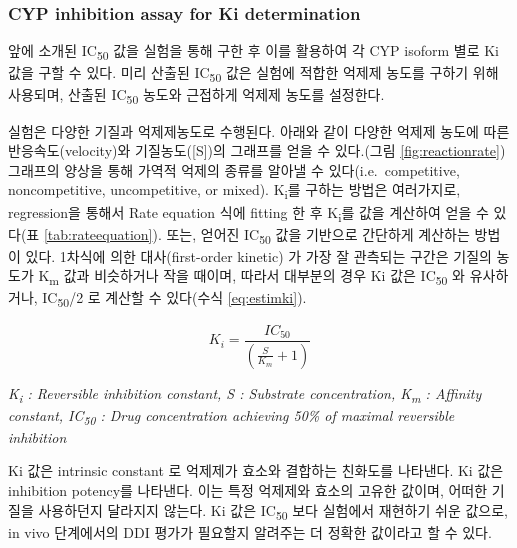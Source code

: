 \documentclass[
  11pt,
  krantz2, a4paper, twoside]{krantz}
\begin{document}
\subsubsection{CYP inhibition assay for Ki determination}\label{cyp-inhibition-assay-for-ki-determination}

앞에 소개된 IC\textsubscript{50} 값을 실험을 통해 구한 후 이를 활용하여 각 CYP isoform
별로 Ki 값을 구할 수 있다. 미리 산출된 IC\textsubscript{50} 값은 실험에 적합한 억제제
농도를 구하기 위해 사용되며, 산출된 IC\textsubscript{50} 농도와 근접하게 억제제 농도를
설정한다.

실험은 다양한 기질과 억제제농도로 수행된다. 아래와 같이 다양한 억제제
농도에 따른 반응속도(velocity)와 기질농도({[}S{]})의 그래프를 얻을 수
있다.(그림 \ref{fig:reactionrate}) 그래프의 양상을 통해 가역적 억제의
종류를 알아낼 수 있다(i.e.~competitive, noncompetitive, uncompetitive,
or mixed). K\textsubscript{i}를 구하는 방법은 여러가지로, regression을 통해서 Rate
equation 식에 fitting 한 후 K\textsubscript{i}를 값을 계산하여 얻을 수 있다(표
\ref{tab:rateequation}). 또는, 얻어진 IC\textsubscript{50} 값을 기반으로 간단하게
계산하는 방법이 있다. 1차식에 의한 대사(first-order kinetic) 가 가장 잘
관측되는 구간은 기질의 농도가 K\textsubscript{m} 값과 비슷하거나 작을 때이며, 따라서
대부분의 경우 Ki 값은 IC\textsubscript{50} 와 유사하거나, IC\textsubscript{50}/2 로 계산할 수
있다(수식 \eqref{eq:estimki}).

\begin{equation}
K_i = \frac{IC_{50}}{(\frac{S}{K_m} + 1)} 
\label{eq:estimki} 
\end{equation}

\emph{K\textsubscript{i} : Reversible inhibition constant, S : Substrate concentration,
K\textsubscript{m} : Affinity constant, IC\textsubscript{50} : Drug concentration achieving 50\% of
maximal reversible inhibition}

Ki 값은 intrinsic constant 로 억제제가 효소와 결합하는 친화도를
나타낸다. Ki 값은 inhibition potency를 나타낸다. 이는 특정 억제제와
효소의 고유한 값이며, 어떠한 기질을 사용하던지 달라지지 않는다. Ki 값은
IC\textsubscript{50} 보다 실험에서 재현하기 쉬운 값으로, in vivo 단계에서의 DDI 평가가
필요할지 알려주는 더 정확한 값이라고 할 수 있다.
\end{document}
